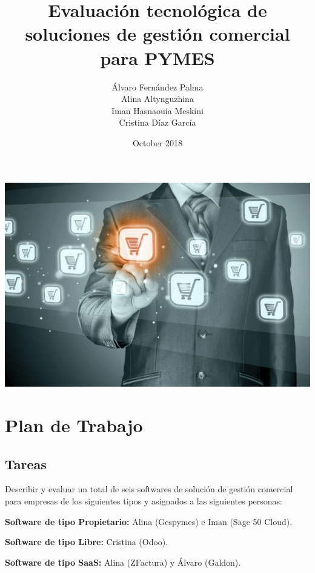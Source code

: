 \documentclass{article}
\title{Evaluación tecnológica de soluciones de gestión comercial para PYMES}
\author{Álvaro Fernández Palma\\ Alina Altynguzhina\\ Iman Hasnaouia Meskini\\ Cristina Díaz García}
\date{October 2018}
\begin{document}

\begin{titlingpage}
\maketitle

\begin{center}
\includegraphics[scale=0.5]{imagenes/gestioncomercial.jpg} 
\end{center}

\end{titlingpage}

\newpage

\tableofcontents

\newpage

\section{Plan de Trabajo}

\subsection{Tareas}

Describir y evaluar un total de seis softwares de solución de gestión comercial para empresas de los siguientes tipos y asignados a las siguientes personas: 

\textbf{Software de tipo Propietario:} Alina (Gespymes) e Iman (Sage 50 Cloud). 

\textbf{Software de tipo Libre:} Cristina (Odoo). 

\textbf{Software de tipo SaaS:} Alina (ZFactura) y Álvaro (Galdon). 
\end{document}

